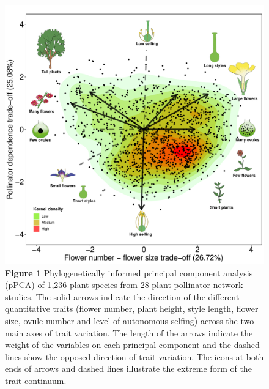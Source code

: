 \documentclass[
  12pt,
  a4paper,
]{article}
\begin{document}
\begin{figure}[H]

{\centering \includegraphics{output/figures/unnamed-chunk-2-1} 

}

\caption{\textbf{Figure 1} Phylogenetically informed principal component analysis (pPCA) of 1,236 plant species from 28 plant-pollinator network studies. The solid arrows indicate the direction of the different quantitative traits (flower number, plant height, style length, flower size, ovule number and level of autonomous selfing) across the two main axes of trait variation. The length of the arrows indicate the weight of the variables on each principal component and the dashed lines show the opposed direction of trait variation. The icons at both ends of arrows and dashed lines illustrate the extreme form of the trait continuum.}\label{fig:unnamed-chunk-2}
\end{figure}
\end{document}
